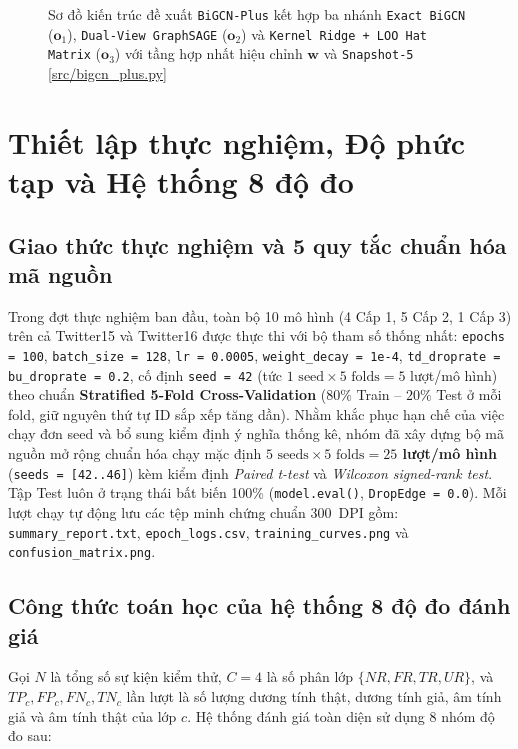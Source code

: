 \documentclass[11pt,a4paper]{extreport}
\newcommand{\ghrepo}{https://github.com/pqui-345/BiGCN-Plus-Rumor-Detection/blob/main}
\newcommand{\coderef}[2]{\textnormal{[\href{\ghrepo/#1}{#2}]}}
\begin{document}
\begin{figure}[htbp]
    \caption[Kiến trúc đề xuất BiGCN-Plus hợp nhất ba nhánh]{Sơ đồ kiến trúc đề xuất \texttt{BiGCN-Plus} kết hợp ba nhánh \texttt{Exact BiGCN} ($\mathbf{o}_1$), \texttt{Dual-View GraphSAGE} ($\mathbf{o}_2$) và \texttt{Kernel Ridge + LOO Hat Matrix} ($\mathbf{o}_3$) với tầng hợp nhất hiệu chỉnh $\mathbf{w}$ và \texttt{Snapshot-5} \coderef{src/bigcn_plus.py}{src/bigcn\_plus.py}}
    \label{fig:bigcn-plus-arch}
\end{figure}

\section{Thiết lập thực nghiệm, Độ phức tạp và Hệ thống 8 độ đo}

\subsection{Giao thức thực nghiệm và 5 quy tắc chuẩn hóa mã nguồn}
Trong đợt thực nghiệm ban đầu, toàn bộ 10 mô hình (4 Cấp 1, 5 Cấp 2, 1 Cấp 3) trên cả Twitter15 và Twitter16 được thực thi với bộ tham số thống nhất: \texttt{epochs = 100}, \texttt{batch\_size = 128}, \texttt{lr = 0.0005}, \texttt{weight\_decay = 1e-4}, \texttt{td\_droprate = bu\_droprate = 0.2}, cố định \texttt{seed = 42} (tức $1\text{ seed} \times 5\text{ folds} = 5$ lượt/mô hình) theo chuẩn \textbf{Stratified 5-Fold Cross-Validation} ($80\%$ Train -- $20\%$ Test ở mỗi fold, giữ nguyên thứ tự ID sắp xếp tăng dần). Nhằm khắc phục hạn chế của việc chạy đơn seed và bổ sung kiểm định ý nghĩa thống kê, nhóm đã xây dựng bộ mã nguồn mở rộng chuẩn hóa chạy mặc định \textbf{$5\text{ seeds} \times 5\text{ folds} = 25$ lượt/mô hình} (\texttt{seeds = [42..46]}) kèm kiểm định \textit{Paired t-test} và \textit{Wilcoxon signed-rank test}. Tập Test luôn ở trạng thái bất biến 100\% (\texttt{model.eval()}, \texttt{DropEdge = 0.0}). Mỗi lượt chạy tự động lưu các tệp minh chứng chuẩn 300~DPI gồm: \texttt{summary\_report.txt}, \texttt{epoch\_logs.csv}, \texttt{training\_curves.png} và \texttt{confusion\_matrix.png}.

\subsection{Công thức toán học của hệ thống 8 độ đo đánh giá}
Gọi $N$ là tổng số sự kiện kiểm thử, $C = 4$ là số phân lớp $\{NR, FR, TR, UR\}$, và $TP_c, FP_c, FN_c, TN_c$ lần lượt là số lượng dương tính thật, dương tính giả, âm tính giả và âm tính thật của lớp $c$. Hệ thống đánh giá toàn diện sử dụng 8 nhóm độ đo sau:
\end{document}
